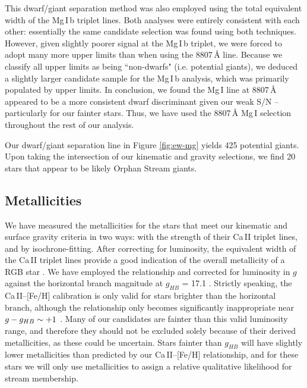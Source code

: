 \documentclass[10pt,apjl]{emulateapj}
\begin{document}
This dwarf/giant separation method was also employed using the total equivalent width of the Mg\,\textsc{I}\,b triplet lines. Both analyses were entirely consistent with each other: essentially the same candidate selection was found using both techniques. However, given slightly poorer signal at the Mg\,\textsc{I}\,b triplet, we were forced to adopt many more upper limits than when using the 8807\,{\AA} line. Because we classify all upper limits as being ``non-dwarfs" (i.e. potential giants), we deduced a slightly larger candidate sample for the Mg\,\textsc{I}\,b analysis, which was primarily populated by upper limits. In conclusion, we found the Mg\,\textsc{I} line at 8807\,{\AA} appeared to be a more consistent dwarf discriminant given our weak S/N \--- particularly for our fainter stars. Thus, we have used the 8807\,{\AA} Mg\,\textsc{I} selection throughout the rest of our analysis.

Our dwarf/giant separation line in Figure \ref{fig:ew-mg} yields 425 potential giants. Upon taking the intersection of our kinematic and gravity selections, we find 20 stars that appear to be likely Orphan Stream giants.


\subsection{Metallicities}
\label{sec:metallicities}

We have measured the metallicities for the stars that meet our kinematic and surface gravity criteria in two ways: with the strength of their Ca\,\textsc{II} triplet lines, and by isochrone-fitting. After correcting for luminosity, the equivalent width of the Ca\,\textsc{II} triplet lines provide a good indication of the overall metallicity of a RGB star \citep{Amandroff_Da_Costa_1991}. We have employed the \citet{Starkenburg_et-al_2010} relationship and corrected for luminosity in $g$ against the horizontal branch magnitude at $g_{HB}$ = 17.1 \citep{Newberg_et-al_2010}. Strictly speaking, the Ca\,\textsc{II}\---[Fe/H] calibration is only valid for stars brighter than the horizontal branch, although the relationship only becomes significantly inappropriate near $g \-- g_{HB} \sim +1$ \citep{Saviane_et-al_2012}. Many of our candidates are fainter than this valid luminosity range, and therefore they should not be excluded solely because of their derived metallicities, as these could be uncertain. Stars fainter than $g_{HB}$ will have slightly lower metallicities than predicted by our Ca\,\textsc{II}\---[Fe/H] relationship, and for these stars we will only use metallicities to assign a relative qualitative likelihood for stream membership.
\end{document}
